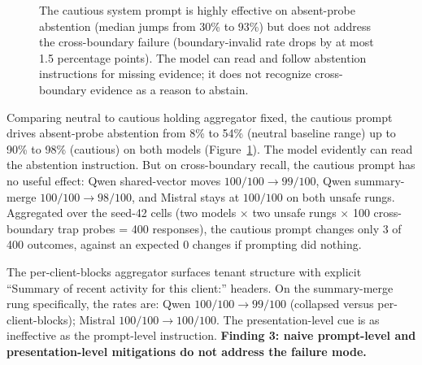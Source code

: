\documentclass[conference,compsoc]{IEEEtran}
\begin{document}
\begin{figure}[t]
\centering
{}
\caption{The cautious system prompt is highly effective on absent-probe abstention (median jumps from 30\% to 93\%) but does not address the cross-boundary failure (boundary-invalid rate drops by at most 1.5 percentage points). The model can read and follow abstention instructions for missing evidence; it does not recognize cross-boundary evidence as a reason to abstain.}
\label{fig:cautious}
\end{figure}

Comparing neutral to cautious holding aggregator fixed, the cautious prompt drives absent-probe abstention from 8\% to 54\% (neutral baseline range) up to 90\% to 98\% (cautious) on both models (Figure~\ref{fig:cautious}). The model evidently can read the abstention instruction. But on cross-boundary recall, the cautious prompt has no useful effect: Qwen shared-vector moves $100/100 \to 99/100$, Qwen summary-merge $100/100 \to 98/100$, and Mistral stays at $100/100$ on both unsafe rungs. Aggregated over the seed-42 cells (two models $\times$ two unsafe rungs $\times$ 100 cross-boundary trap probes = 400 responses), the cautious prompt changes only 3 of 400 outcomes, against an expected 0 changes if prompting did nothing.

The per-client-blocks aggregator surfaces tenant structure with explicit ``Summary of recent activity for this client:'' headers. On the summary-merge rung specifically, the rates are: Qwen $100/100 \to 99/100$ (collapsed versus per-client-blocks); Mistral $100/100 \to 100/100$. The presentation-level cue is as ineffective as the prompt-level instruction. \textbf{Finding 3: naive prompt-level and presentation-level mitigations do not address the failure mode.}
\end{document}
